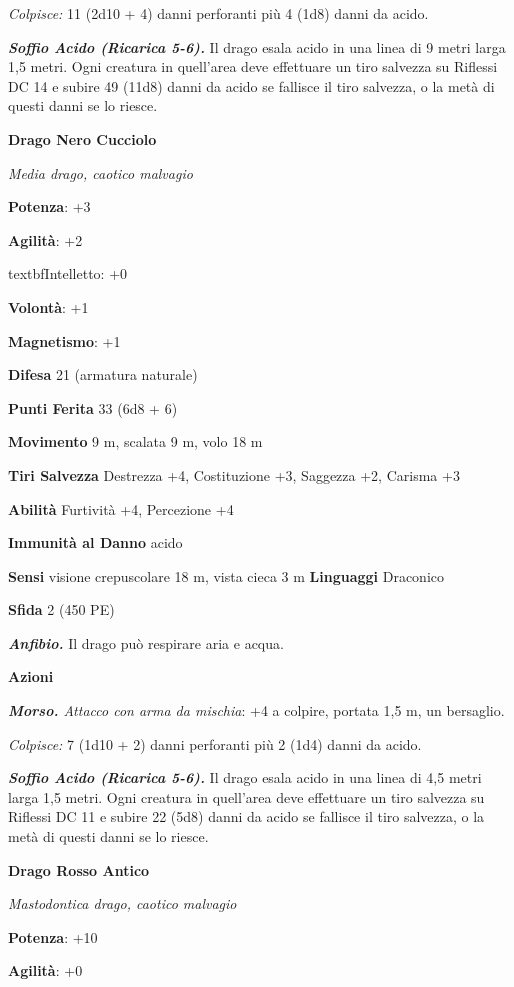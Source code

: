 \begin{multicols}{2}
\emph{Colpisce:} 11 (2d10 + 4) danni perforanti più 4 (1d8) danni da
acido.

\emph{\textbf{Soffio Acido (Ricarica 5-6).}} Il drago esala acido in una
linea di 9 metri larga 1,5 metri. Ogni creatura in quell'area deve
effettuare un tiro salvezza su Riflessi DC 14 e subire 49 (11d8) danni
da acido se fallisce il tiro salvezza, o la metà di questi danni se lo
riesce.

\textbf{Drago Nero Cucciolo}

\emph{Media drago, caotico malvagio}

\textbf{Potenza}: +3

\textbf{Agilità}: +2


textbf{Intelletto}: +0

\textbf{Volontà}: +1

\textbf{Magnetismo}: +1

\textbf{Difesa} 21 (armatura naturale)

\textbf{Punti Ferita} 33 (6d8 + 6)

\textbf{Movimento} 9 m, scalata 9 m, volo 18 m

\textbf{Tiri Salvezza} Destrezza +4, Costituzione +3, Saggezza +2,
Carisma +3

\textbf{Abilità} Furtività +4, Percezione +4

\textbf{Immunità al Danno} acido

\textbf{Sensi} visione crepuscolare 18 m, vista cieca 3 m
\textbf{Linguaggi} Draconico

\textbf{Sfida} 2 (450 PE)

\emph{\textbf{Anfibio.}} Il drago può respirare aria e acqua.

\textbf{Azioni}

\emph{\textbf{Morso.} Attacco con arma da mischia}: +4 a colpire,
portata 1,5 m, un bersaglio.

\emph{Colpisce:} 7 (1d10 + 2) danni perforanti più 2 (1d4) danni da
acido.

\emph{\textbf{Soffio Acido (Ricarica 5-6).}} Il drago esala acido in una
linea di 4,5 metri larga 1,5 metri. Ogni creatura in quell'area deve
effettuare un tiro salvezza su Riflessi DC 11 e subire 22 (5d8) danni
da acido se fallisce il tiro salvezza, o la metà di questi danni se lo
riesce.

\textbf{Drago Rosso Antico}

\emph{Mastodontica drago, caotico malvagio}

\textbf{Potenza}: +10

\textbf{Agilità}: +0


\end{multicols}
